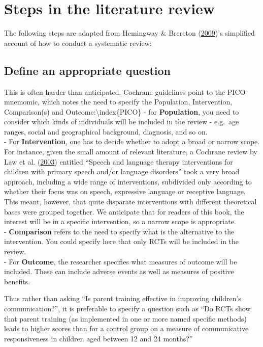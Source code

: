 \documentclass{krantz}
\begin{document}
\hypertarget{steps-in-the-literature-review}{%
\section{Steps in the literature review}\label{steps-in-the-literature-review}}

The following steps are adapted from Hemingway \& Brereton (\protect\hyperlink{ref-hemingway2009}{2009})'s simplified account of how to conduct a systematic review:\\

\hypertarget{define-an-appropriate-question}{%
\subsection{Define an appropriate question}\label{define-an-appropriate-question}}

This is often harder than anticipated. Cochrane guidelines point to the PICO mnemomic, which notes the need to specify the Population, Intervention, Comparison(s) and Outcome:\textbackslash index\{PICO\}
- for \textbf{Population}, you need to consider which kinds of individuals will be included in the review - e.g.~age ranges, social and geographical background, diagnosis, and so on.\\
- For \textbf{Intervention}, one has to decide whether to adopt a broad or narrow scope. For instance, given the small amount of relevant literature, a Cochrane review by Law et al. (\protect\hyperlink{ref-law2003}{2003}) entitled ``Speech and language therapy interventions for children with primary speech and/or language disorders'' took a very broad approach, including a wide range of interventions, subdivided only according to whether their focus was on speech, expressive language or receptive language. This meant, however, that quite disparate interventions with different theoretical bases were grouped together. We anticipate that for readers of this book, the interest will be in a specific intervention, so a narrow scope is appropriate.\\
- \textbf{Comparison} refers to the need to specify what is the alternative to the intervention. You could specify here that only RCTs will be included in the review.\\
- For \textbf{Outcome}, the researcher specifies what measures of outcome will be included. These can include adverse events as well as measures of positive benefits.

Thus rather than asking ``Is parent training effective in improving children's communication?'', it is preferable to specify a question such as ``Do RCTs show that parent training (as implemented in one or more named specific methods) leads to higher scores than for a control group on a measure of communicative responsiveness in children aged between 12 and 24 months?''
\end{document}
